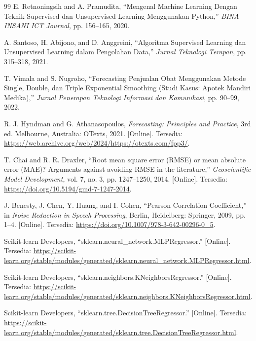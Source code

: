 \documentclass[a4paper,oneside,12pt]{report}
\renewcommand{\bibname}{Daftar Pustaka}
\begin{document}
\clearpage
{}
\renewcommand{\bibname}{Daftar Pustaka}
\begin{thebibliography}{99}
     E. Retnoningsih and A. Pramudita, ``Mengenal Machine Learning Dengan Teknik Supervised dan Unsupervised Learning Menggunakan Python,'' \textit{BINA INSANI ICT Journal}, pp. 156--165, 2020.

     A. Santoso, H. Abijono, and D. Anggreini, ``Algoritma Supervised Learning dan Unsupervised Learning dalam Pengolahan Data,'' \textit{Jurnal Teknologi Terapan}, pp. 315--318, 2021.

     T. Vimala and S. Nugroho, ``Forecasting Penjualan Obat Menggunakan Metode Single, Double, dan Triple Exponential Smoothing (Studi Kasus: Apotek Mandiri Medika),'' \textit{Jurnal Penerapan Teknologi Informasi dan Komunikasi}, pp. 90--99, 2022.

     R. J. Hyndman and G. Athanasopoulos, \textit{Forecasting: Principles and Practice}, 3rd ed. Melbourne, Australia: OTexts, 2021. [Online]. Tersedia: \url{https://web.archive.org/web/2024/https://otexts.com/fpp3/}.

     T. Chai and R. R. Draxler, ``Root mean square error (RMSE) or mean absolute error (MAE)? Arguments against avoiding RMSE in the literature,'' \textit{Geoscientific Model Development}, vol. 7, no. 3, pp. 1247--1250, 2014. [Online]. Tersedia: \url{https://doi.org/10.5194/gmd-7-1247-2014}.

     J. Benesty, J. Chen, Y. Huang, and I. Cohen, ``Pearson Correlation Coefficient,'' in \textit{Noise Reduction in Speech Processing}, Berlin, Heidelberg: Springer, 2009, pp. 1--4. [Online]. Tersedia: \url{https://doi.org/10.1007/978-3-642-00296-0_5}.

     Scikit-learn Developers, ``sklearn.neural\_network.MLPRegressor.'' [Online]. Tersedia: \url{https://scikit-learn.org/stable/modules/generated/sklearn.neural_network.MLPRegressor.html}.

     Scikit-learn Developers, ``sklearn.neighbors.KNeighborsRegressor.'' [Online]. Tersedia: \url{https://scikit-learn.org/stable/modules/generated/sklearn.neighbors.KNeighborsRegressor.html}.

     Scikit-learn Developers, ``sklearn.tree.DecisionTreeRegressor.'' [Online]. Tersedia: \url{https://scikit-learn.org/stable/modules/generated/sklearn.tree.DecisionTreeRegressor.html}.


\end{thebibliography}
\end{document}
